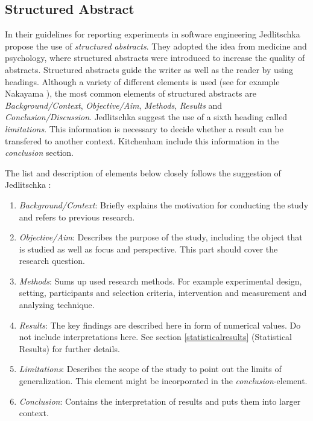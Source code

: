 
\subsection{Structured Abstract}
\label{subsec:structured abstract}

In their guidelines for reporting experiments in software engineering Jedlitschka \etal \cite{Jedlitschka2008} propose the use of \emph{structured abstracts}. They adopted the idea from medicine and psychology, where structured abstracts were introduced to increase the quality of abstracts. Structured abstracts guide the writer as well as the reader by using headings. Although a variety of different elements is used (see for example Nakayama \etal \cite{nakayama2005adoption}), the most common elements of structured abstracts are \emph{Background/Context}, \emph{Objective/Aim}, \emph{Methods}, \emph{Results} and \emph{Conclusion/Discussion}. Jedlitschka \etal \cite{Jedlitschka2008} suggest the use of a sixth heading called \emph{limitations}. This information is necessary to decide whether a result can be transfered to another context. Kitchenham \etal \cite{KBO2008} include this information in the \emph{conclusion} section.

The list and description of elements below closely follows the suggestion of Jedlitschka \etal \cite{Jedlitschka2008}:
\begin{enumerate}
	\item \emph{Background/Context}: Briefly explains the motivation for conducting the study and refers to previous research.
	\item \emph{Objective/Aim}: Describes the purpose of the study, including the object that is studied as well as focus and perspective. This part should cover the research question.
	\item \emph{Methods}: Sums up used research methods. For example experimental design, setting, participants and selection criteria, intervention and measurement and analyzing technique.
	\item \emph{Results}: The key findings are described here in form of numerical values. Do not include interpretations here. See section \ref{statisticalresults} (Statistical Results) for further details.
	\item \emph{Limitations}: Describes the scope  of the study to point out the limits of generalization. This element might be incorporated in the \emph{conclusion}-element.
	\item \emph{Conclusion}:  Contains the interpretation of results and puts them into larger context.
\end{enumerate}

